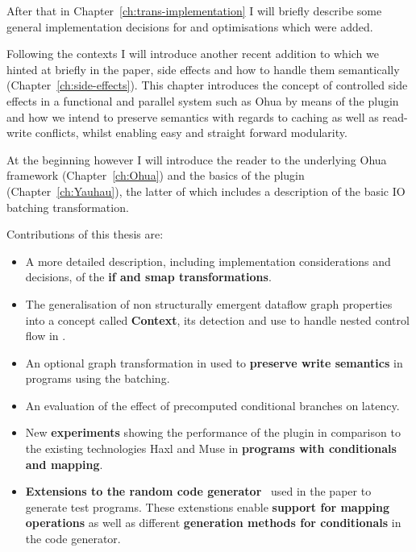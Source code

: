 After that in Chapter~\ref{ch:trans-implementation} I will briefly describe some general implementation decisions for \yauhau{} and optimisations which were added.

Following the contexts I will introduce another recent addition to \yauhau{} which we hinted at briefly in the paper, side effects and how to handle them semantically (Chapter~\ref{ch:side-effects}).
This chapter introduces the concept of controlled side effects in a functional and parallel system such as Ohua by means of the \yauhau{} plugin and how we intend to preserve semantics with regards to caching as well as read-write conflicts, whilst enabling easy and straight forward modularity.

At the beginning however I will introduce the reader to the underlying Ohua framework (Chapter~\ref{ch:Ohua}) and the basics of the \yauhau{} plugin (Chapter~\ref{ch:Yauhau}), the latter of which includes a description of the basic IO batching transformation.

Contributions of this thesis are:
\begin{itemize}
    \item A more detailed description, including implementation considerations and decisions, of the \textbf{if and smap transformations}.
    \item The generalisation of non structurally emergent dataflow graph properties into a concept called \textbf{Context}, its detection and use to handle nested control flow in \yauhau{}.
    \item An optional graph transformation in \yauhau{} used to \textbf{preserve write semantics} in programs using the \yauhau{} batching.
    \item An evaluation of the effect of precomputed conditional branches on latency.
    \item New \textbf{experiments} showing the performance of the \yauhau{} plugin in comparison to the existing technologies Haxl and Muse in \textbf{programs with conditionals and mapping}.
    \item \textbf{Extensions to the random code generator}~\cite{Goens-rand-code-graph} used in the \yauhau{} paper to generate test programs.
    These extenstions enable \textbf{support for mapping operations} as well as different \textbf{generation methods for conditionals} in the code generator.
\end{itemize}

